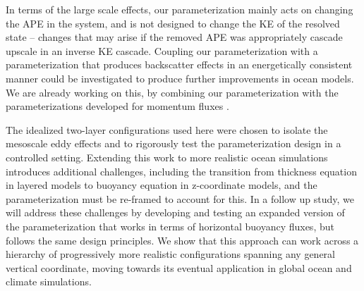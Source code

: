 \documentclass[draft]{agujournal2019}
\begin{document}
In terms of the large scale effects, our parameterization mainly acts on changing the APE in the system, and is not designed to change the KE of the resolved state -- changes that may arise if the removed APE was appropriately cascade upscale in an inverse KE cascade. Coupling our parameterization with a parameterization that produces backscatter effects in an energetically consistent manner could be investigated to produce further improvements in ocean models. We are already working on this, by combining our parameterization with the parameterizations developed for momentum fluxes \cite{perezhogin2024stable, perezhogin2025generalizable}. 

The idealized two-layer configurations used here were chosen to isolate the mesoscale eddy effects and to rigorously test the parameterization design in a controlled setting. Extending this work to more realistic ocean simulations introduces additional challenges, including the transition from thickness equation in layered models to buoyancy equation in z-coordinate models, and the parameterization must be re-framed to account for this. In a follow up study, we will address these challenges by developing and testing an expanded version of the parameterization that works in terms of horizontal buoyancy fluxes, but follows the same design principles. We show that this approach can work across a hierarchy of progressively more realistic configurations spanning any general vertical coordinate, moving towards its eventual application in global ocean and climate simulations.




\end{document}
